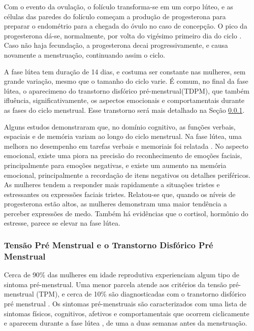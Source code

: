 Com o evento da ovulação, o folículo transforma-se em um corpo lúteo, e as 
células das paredes do folículo começam a produção de progesterona para 
preparar o endométrio para a chegada do óvulo no caso de concepção. 
O pico da progesterona dá-se, normalmente, por volta do vigésimo primeiro 
dia do ciclo \cite{nikas2003}. Caso não haja fecundação, a progesterona 
decai progressivamente, e causa novamente a menstruação, continuando assim 
o ciclo.

A fase lútea tem duração de 14 dias, e costuma ser constante nas mulheres, 
sem grande variação, mesmo que o tamanho do ciclo varie. É comum, no final 
da fase lútea, o aparecimeno do transtorno disfórico pré-menstrual(TDPM), 
que também ifluência, significativamente, os aspectos emocionais e 
comportamentais durante as fases do ciclo menstrual. Esse transtorno 
será mais detalhado na Seção \ref{tpm}.

Alguns estudos demonstraram que, no domínio cognitivo, as funções verbais, 
espaciais e de memória variam ao longo do ciclo menstrual. Na fase lútea, 
uma melhora no desempenho em tarefas verbais e memoriais foi relatada 
\cite{hausmann2000}. No aspecto emocional, existe uma piora na precisão 
do reconhecimento de emoções faciais, principalmente para emoções negativas, 
e existe um aumento na memória emocional, principalmente a recordação de 
itens negativos ou detalhes periféricos. As mulheres tendem a responder 
mais rapidamente a situações tristes e estressantes ou expressões faciais 
tristes. Relatou-se que, quando os níveis de progesterona estão altos, as 
mulheres demonstram uma maior tendência a perceber expressões de medo. 
Também há evidências que o cortisol, hormônio do estresse, parece se elevar 
na fase lútea\cite{kirschbaum1999}.

\subsubsection{Tensão Pré Menstrual e o Transtorno Disfórico Pré Menstrual}
\label{tpm}

Cerca de 90\% das mulheres em idade reprodutiva experienciam algum tipo de 
sintoma pré-menstrual. Uma menor parcela atende aos critérios da tensão 
pré-menstrual (TPM), e cerca de 10\% são diagnosticadas com o transtorno 
disfórico pré menstrual \cite{mishell2005}. Os sintomas pré-menstruais 
são caracterizados com uma lista de sintomas físicos, cognitivos, 
afetivos e comportamentais que ocorrem ciclicamente e aparecem durante a 
fase lútea \cite{obrien2011}, de uma a duas semanas antes da menstruação. 

